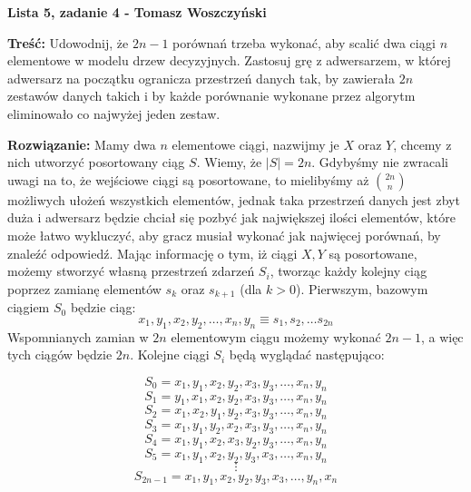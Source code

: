 \documentclass[a4paper,12pt]{article}
\begin{document}
\noindent \textbf{Lista 5, zadanie 4 - Tomasz Woszczyński}\newline

\noindent \newline \textbf{Treść:} Udowodnij, że $2n-1$ porównań trzeba wykonać, aby scalić dwa ciągi $n$ elementowe w modelu drzew decyzyjnych. Zastosuj grę z adwersarzem, w której adwersarz na początku ogranicza przestrzeń danych tak, by zawierała $2n$ zestawów danych takich i by każde porównanie wykonane przez algorytm eliminowało co najwyżej jeden zestaw. \newline

\noindent \textbf{Rozwiązanie:} Mamy dwa $n$ elementowe ciągi, nazwijmy je $X$ oraz $Y$, chcemy z nich utworzyć posortowany ciąg $S$. Wiemy, że $\vert S \vert = 2n$. Gdybyśmy nie zwracali uwagi na to, że wejściowe ciągi są posortowane, to mielibyśmy aż $\binom{2n}{n}$ możliwych ułożeń wszystkich elementów, jednak taka przestrzeń danych jest zbyt duża i adwersarz będzie chciał się pozbyć jak największej ilości elementów, które może łatwo wykluczyć, aby gracz musiał wykonać jak najwięcej porównań, by znaleźć odpowiedź. Mając informację o tym, iż ciągi $X, Y$ są posortowane, możemy stworzyć własną przestrzeń zdarzeń $S_i$, tworząc każdy kolejny ciąg poprzez zamianę elementów $s_k$ oraz $s_{k+1}$ (dla $k>0$). Pierwszym, bazowym ciągiem $S_0$ będzie ciąg: 
$$x_1, y_1, x_2, y_2, \dots, x_n, y_n \equiv s_1, s_2, \ldots s_{2n}$$
\noindent Wspomnianych zamian w $2n$ elementowym ciągu możemy wykonać $2n-1$, a więc tych ciągów będzie $2n$. Kolejne ciągi $S_i$ będą wyglądać następująco:

$$S_0 = x_1, y_1, x_2, y_2, x_3, y_3,\dots, x_n, y_n$$
$$S_1 = y_1, x_1, x_2, y_2, x_3, y_3,\dots, x_n, y_n$$
$$S_2 = x_1, x_2, y_1, y_2, x_3, y_3,\dots, x_n, y_n$$
$$S_3 = x_1, y_1, y_2, x_2, x_3, y_3,\dots, x_n, y_n$$
$$S_4 = x_1, y_1, x_2, x_3, y_2, y_3,\dots, x_n, y_n$$
$$S_5 = x_1, y_1, x_2, y_2, y_3, x_3,\dots, x_n, y_n$$
$$\vdots$$
$$S_{2n-1} =  x_1, y_1, x_2, y_2, y_3, x_3,\dots, y_n, x_n$$
\end{document}
